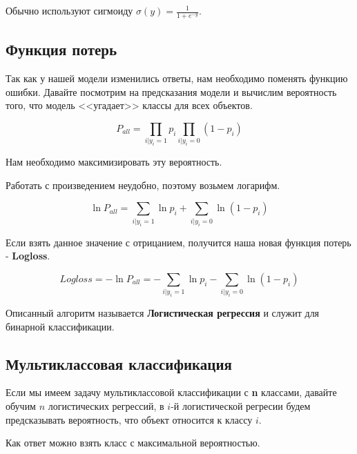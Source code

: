 Обычно используют сигмоиду $\sigma(y) = \frac{1}{1 + e^{-y}}$.

\subsection{Функция потерь}

Так как у нашей модели изменились ответы, нам необходимо поменять функцию ошибки. Давайте посмотрим на предсказания модели и вычислим вероятность того, что модель <<угадает>> классы для всех объектов.

$$P_{all} = \prod_{i | y_i=1}p_i \prod_{i | y_i=0}(1 - p_i)$$

Нам необходимо максимизировать эту вероятность.

Работать с произведением неудобно, поэтому возьмем логарифм.

$$\ln{P_{all}} = \sum_{i | y_i=1}\ln{p_i} + \sum_{i | y_i=0}\ln(1 - p_i)$$

Если взять данное значение с отрицанием, получится наша новая функция потерь - \textbf{Logloss}.

$$Logloss = -\ln{P_{all}} = -\sum_{i | y_i=1}\ln{p_i} - \sum_{i | y_i=0}\ln(1 - p_i)$$

Описанный алгоритм называется \textbf{Логистическая регрессия} и служит для бинарной классификации.

\subsection{Мультиклассовая классификация}
Если мы имеем задачу мультиклассовой классификации с \textbf{n} классами, давайте обучим $n$ логистических регрессий, в $i$-й логистической регресии будем предсказывать вероятность, что объект относится к классу $i$. 

Как ответ можно взять класс с максимальной вероятностью.